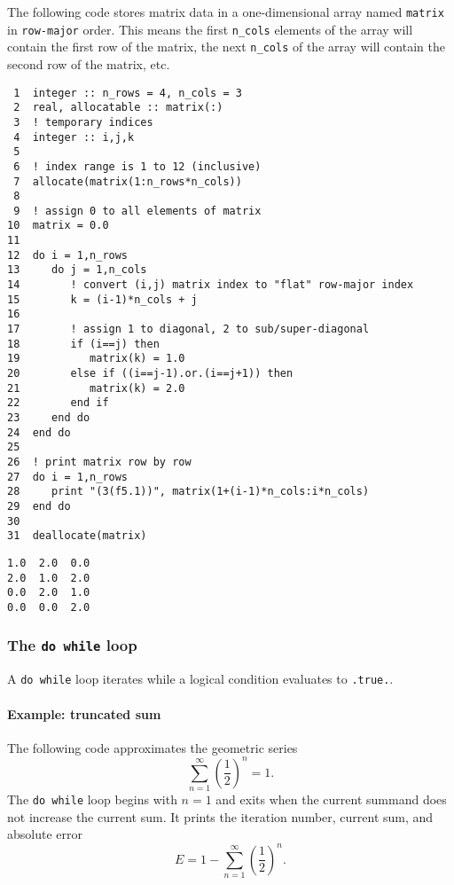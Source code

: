 \documentclass[11pt]{article}
\begin{document}
The following code stores matrix data in a one-dimensional array named \texttt{matrix} in \texttt{row-major} order. This means the first \texttt{n\_cols} elements of the array will contain the first row of the matrix, the next \texttt{n\_cols} of the array will contain the second row of the matrix, etc.

\begin{verbatim}
 1  integer :: n_rows = 4, n_cols = 3
 2  real, allocatable :: matrix(:)
 3  ! temporary indices
 4  integer :: i,j,k
 5  
 6  ! index range is 1 to 12 (inclusive)
 7  allocate(matrix(1:n_rows*n_cols))
 8  
 9  ! assign 0 to all elements of matrix
10  matrix = 0.0
11  
12  do i = 1,n_rows
13     do j = 1,n_cols
14        ! convert (i,j) matrix index to "flat" row-major index
15        k = (i-1)*n_cols + j
16  
17        ! assign 1 to diagonal, 2 to sub/super-diagonal
18        if (i==j) then
19           matrix(k) = 1.0
20        else if ((i==j-1).or.(i==j+1)) then
21           matrix(k) = 2.0
22        end if
23     end do
24  end do
25  
26  ! print matrix row by row
27  do i = 1,n_rows
28     print "(3(f5.1))", matrix(1+(i-1)*n_cols:i*n_cols)
29  end do
30  
31  deallocate(matrix)
\end{verbatim}

\begin{verbatim}
1.0  2.0  0.0
2.0  1.0  2.0
0.0  2.0  1.0
0.0  0.0  2.0
\end{verbatim}

\subsubsection{The \texttt{do while} loop}
\label{sec:orgheadline32}
A \texttt{do while} loop iterates while a logical condition evaluates to \texttt{.true.}.
\paragraph{Example: truncated sum}
\label{sec:orgheadline30}
The following code approximates the geometric series
\begin{equation*}
\sum_{n=1}^{\infty}\left(\frac12\right)^n=1.
\end{equation*}
The \texttt{do while} loop begins with \(n=1\) and exits when the current summand does not increase the current sum. It prints the iteration number, current sum, and absolute error
\begin{equation*}
E=1-\sum_{n=1}^{\infty}\left(\frac12\right)^n.
\end{equation*}
\end{document}
